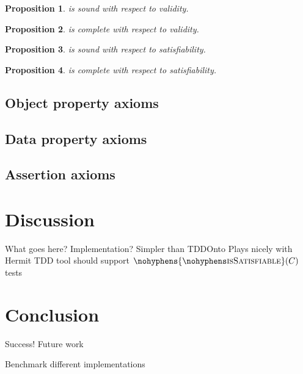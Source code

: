 \documentclass[draft]{sig-alternate}
\newtheorem{proposition}{Proposition}
\let\oldtextproc\textproc
\renewcommand{\textproc}[1]{\nohyphens{\oldtextproc{#1}}}
\begin{document}
\begin{proposition}
   is sound with respect to validity.
\end{proposition}

\begin{proposition}
   is complete with respect to validity.
\end{proposition}

\begin{proposition}
   is sound with respect to satisfiability.
\end{proposition}

\begin{proposition}
   is complete with respect to satisfiability.
\end{proposition}

\subsection{Object property axioms}
\subsection{Data property axioms}
\subsection{Assertion axioms}

\section{Discussion}

\begin{todos}
  \todo What goes here?
  \todo Implementation?
  \todo Simpler than TDDOnto
  \todo Plays nicely with Hermit
  \todo TDD tool should support $\textproc{isSatisfiable}(C)$ tests
\end{todos}

\section{Conclusion}

\begin{todos}
  \todo Success!
  \todo Future work
  \begin{todos}
    \todo Benchmark different implementations
  \end{todos}
\end{todos}
\end{document}
